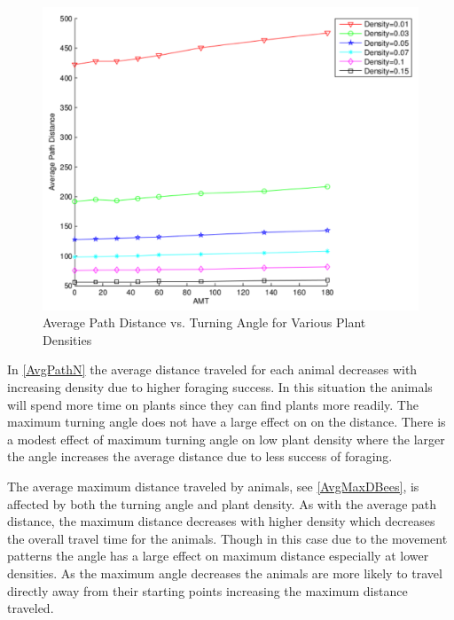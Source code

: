 \begin{figure}
  \begin{center}
  \includegraphics[scale=0.5]{PathVsAMT.pdf}
  \end{center}
  \caption{\small Average Path Distance vs. Turning Angle for Various Plant Densities}
  \label{AvgPathN}
\end{figure}

In \autoref{AvgPathN} the average distance traveled for each animal decreases
with increasing density due to higher foraging success.  In this situation the
animals will spend more time on plants since they can find plants more readily.
The maximum turning angle does not have a large effect on on the distance.
There is a modest effect of maximum turning angle on low plant density where the
larger the angle increases the average distance due to less success of foraging.

The average maximum distance traveled by animals, see \autoref{AvgMaxDBees}, is
affected by both the turning angle and plant density. As with the average path
distance, the maximum distance decreases with higher density which decreases the
overall travel time for the animals.  Though in this case due to the movement
patterns the angle has a large effect on maximum distance especially at lower
densities.  As the maximum angle decreases the animals are more likely to travel
directly away from their starting points increasing the maximum distance
traveled.

